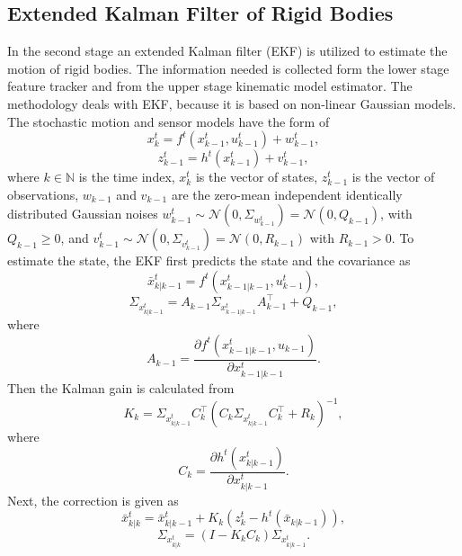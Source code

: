\documentclass[letterpaper, 10 pt, conference]{ieeeconf}
\begin{document}
\subsection{Extended Kalman Filter of Rigid Bodies}\label{EKFrb}
In the second stage an extended Kalman filter (EKF) is utilized to estimate the motion of rigid bodies. The information needed is collected form the lower stage feature tracker and from the upper stage kinematic model estimator. The methodology deals with EKF, because it is based on non-linear Gaussian models. The stochastic motion and sensor models have the form of
\begin{equation}
x_k^t=f^t(x_{k-1}^t,u_{k-1}^t)+w_{k-1}^t,
\end{equation} 
\begin{equation}\label{obsM}
z_{k-1}^t=h^t(x_{k-1}^t)+v_{k-1}^t,
\end{equation} 
where $k \in \mathbb{N}$ is the time index, $x_k^t$ is the vector of states, $z_{k-1}^t$ is the vector of observations, $w_{k-1}$ and $v_{k-1}$ are the zero-mean independent identically distributed Gaussian noises $w_{k-1}^t \sim \mathcal{N}(0, \Sigma_{w_{k-1}^t})=\mathcal{N}(0, Q_{k-1})$, with $Q_{k-1} \geq 0$, and $v_{k-1}^t \sim \mathcal{N}(0, \Sigma_{v_{k-1}^t})=\mathcal{N}(0, R_{k-1})$ with $R_{k-1}>0$.
To estimate the state, the EKF first predicts the state and the covariance as
\begin{equation}
\bar{x}_{k|k-1}^t=f^t(x^t_{k-1|k-1},u^t_{k-1}),
\end{equation}
\begin{equation}
\Sigma_{x_{k|k-1}^t}=A_{k-1} \Sigma_{x_{k-1|k-1}^t} A_{k-1}^{\intercal} +Q_{k-1},
\end{equation}
where
\begin{equation}
A_{k-1}= \frac{\partial f^t(x_{k-1|k-1}^t,u_{k-1})}{\partial x_{k-1|k-1}^t}.
\end{equation}
Then the Kalman gain is calculated from 
\begin{equation}
K_{k}= \Sigma_{x_{k|k-1}^t} C_k^{\intercal}(C_k \Sigma_{x_{k|k-1}^t} C_k^{\intercal}+ R_{k})^{-1},
\end{equation}
where
\begin{equation}
C_k= \frac{\partial h^t(x_{k|k-1}^t)}{\partial x^t_{k|k-1}}.
\end{equation}
Next, the correction is given as
\begin{equation}
\bar{x}_{k|k}^t=\bar{x}_{k|k-1}^t+K_k(z_k^t-h^t(\bar{x}_{k|k-1})),
\end{equation}
\begin{equation}
\Sigma_{x_{k|k}^t}=(I-K_kC_k)\Sigma_{x_{k|k-1}^t}.
\end{equation}
\end{document}
